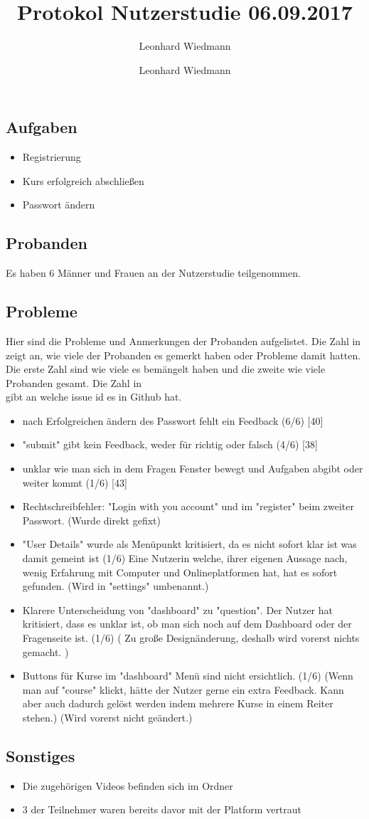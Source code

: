 \documentclass[colorback, accentcolor=tud1c, paper=a4]{tudexercise}
\title{Protokol Nutzerstudie 06.09.2017}
\subtitle{Leonhard Wiedmann}
\author{Leonhard Wiedmann}
\begin{document}
\maketitle
\subsection*{Aufgaben}
	\begin{itemize}
	\item Registrierung
  \item Kurs erfolgreich abschließen
  \item Passwort ändern
	\end{itemize}

\subsection*{Probanden}
Es haben 6 Männer und Frauen an der Nutzerstudie teilgenommen.

\subsection*{Probleme}
  Hier sind die Probleme und Anmerkungen der Probanden aufgelistet. Die Zahl in \( \) zeigt an, wie viele der Probanden es gemerkt haben oder Probleme damit hatten. Die erste Zahl sind wie viele es bemängelt haben und die zweite wie viele Probanden gesamt. Die Zahl in \[ \] gibt an welche issue id es in Github hat.
  \begin{itemize}
    \item nach Erfolgreichen ändern des Passwort fehlt ein Feedback (6/6) [40]
		\item "submit" gibt kein Feedback, weder für richtig oder falsch (4/6) [38]
		\item unklar wie man sich in dem Fragen Fenster bewegt und Aufgaben abgibt oder weiter kommt (1/6) [43]
		\item Rechtschreibfehler: "Login with you account" und im "register" beim zweiter Passwort. (Wurde direkt gefixt)
		\item "User Details" wurde als Menüpunkt kritisiert, da es nicht sofort klar ist was damit gemeint ist (1/6) { Eine Nutzerin welche, ihrer eigenen Aussage nach, wenig Erfahrung mit Computer und Onlineplatformen hat, hat es sofort gefunden. } (Wird in "settings" umbenannt.)
		\item Klarere Unterscheidung von "dashboard" zu "question". Der Nutzer hat kritisiert, dass es unklar ist, ob man sich noch auf dem Dashboard oder der Fragenseite ist. (1/6) ( Zu große Designänderung, deshalb wird vorerst nichts gemacht. )
    \item Buttons für Kurse im "dashboard" Menü sind nicht ersichtlich. (1/6) (Wenn man auf "course" klickt, hätte der Nutzer gerne ein extra Feedback. Kann aber auch dadurch gelöst werden indem mehrere Kurse in einem Reiter stehen.) (Wird vorerst nicht geändert.)
   \end{itemize}

 \subsection*{Sonstiges}
 	\begin{itemize}
		\item Die zugehörigen Videos befinden sich im Ordner
		\item 3 der Teilnehmer waren bereits davor mit der Platform vertraut
	\end{itemize}
\end{document}
